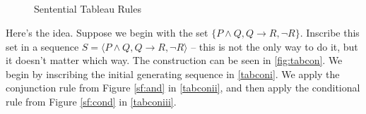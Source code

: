 \begin{figure}
    \centering
{}\qquad
{}\\
\qquad
{}\\
\qquad
{}\\
\qquad
{}\\
  \caption{Sentential Tableau Rules \label{fig:stableaux}}
\end{figure}

Here's the idea. Suppose we begin with the set $\{P\wedge Q,Q \to R, ¬R\}$. Inscribe this set in a sequence $S = \langle P\wedge Q,Q \to R, ¬R\rangle$ – this is not the only way to do it, but it doesn't matter which way. The construction can be seen in \autoref{fig:tabcon}. We begin by inscribing the initial generating sequence in \ref{tabconi}. We apply the conjunction rule from Figure \ref{sf:and} in \ref{tabconii}, and then apply the conditional rule from Figure \ref{sf:cond} in \ref{tabconiii}.

